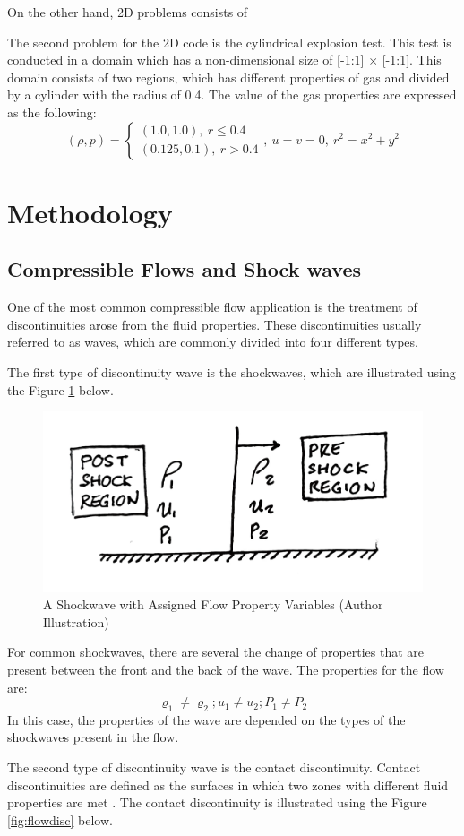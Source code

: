 \documentclass[11pt]{article}
\begin{document}
On the other hand, 2D problems consists of \par
\medskip
The second problem for the 2D code is the cylindrical explosion test. This test is conducted in a domain which has a non-dimensional size of [-1:1] $\times$ [-1:1]. This domain consists of two regions, which has different properties of gas and divided by a cylinder with the radius of 0.4. The value of the gas properties are expressed as the following:
\begin{equation*}
(\rho, p) =
    \begin{cases}
        (1.0, 1.0), \ r \le 0.4 \\
        (0.125, 0.1), \ r > 0.4
    \end{cases}\!,\ u = v = 0,\ r^2 = x^2+y^2
\end{equation*}

\section{Methodology}
\subsection{Compressible Flows and Shock waves}
One of the most common compressible flow application is the treatment of discontinuities arose from the fluid properties. These discontinuities usually referred to as waves, which are commonly divided into four different types. \par
\medskip
The first type of discontinuity wave is the shockwaves, which are illustrated using the Figure \ref{fig:normalshock} below. 
\begin{figure}[ht]
    \centering
    \includegraphics[width=0.4\linewidth]{Pictures/Normalshock.jpg}
    \caption{A Shockwave with Assigned Flow Property Variables (Author Illustration)}
    \label{fig:normalshock}
\end{figure}
For common shockwaves, there are several the change of properties that are present between the front and the back of the wave. The properties for the flow are:
\begin{equation*}
    \varrho_1 \ne \varrho_2 ; u_1 \ne u_2 ; P_1 \ne P_2
\end{equation*}
In this case, the properties of the wave are depended on the types of the shockwaves present in the flow. \par
\medskip
The second type of discontinuity wave is the contact discontinuity. Contact discontinuities are defined as the surfaces in which two zones with different fluid properties are met \citet{Norman1985}. The contact discontinuity is illustrated using the Figure \ref{fig:flowdisc} below.
\end{document}
